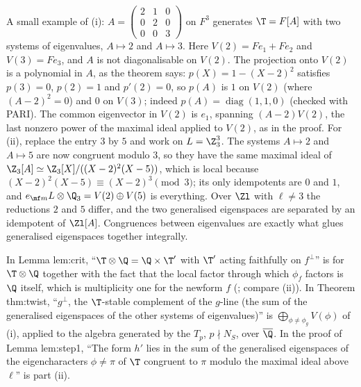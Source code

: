 A small example of (i): $A=\begin{pmatrix}2&1&0\\0&2&0\\0&0&3\end{pmatrix}$ on $F^3$ generates $\T=F[A]$ with two systems of eigenvalues, $A\mapsto2$ and $A\mapsto3$.
Here $V(2)=Fe_1+Fe_2$ and $V(3)=Fe_3$, and $A$ is not diagonalisable on $V(2)$. The projection onto $V(2)$ is a polynomial in $A$, as the theorem
says: $p(X)=1-(X-2)^2$ satisfies $p(3)=0$, $p(2)=1$ and $p'(2)=0$, so $p(A)$ is $1$ on $V(2)$ (where $(A-2)^2=0$) and $0$ on $V(3)$; indeed
$p(A)=\operatorname{diag}(1,1,0)$ (checked with PARI). The common eigenvector in $V(2)$ is $e_1$, spanning $(A-2)V(2)$, the last nonzero power
of the maximal ideal applied to $V(2)$, as in the proof. For (ii), replace the entry $3$ by $5$ and work on $L=\Z_3^3$. The systems
$A\mapsto2$ and $A\mapsto5$ are now congruent modulo $3$, so they have the same maximal ideal of $\Z_3[A]\simeq\Z_3[X]/((X-2)^2(X-5))$, which is
local because $(X-2)^2(X-5)\equiv(X-2)^3\pmod3$; its only idempotents are $0$ and $1$, and $e_{\mf m}L\otimes\Q_3=V(2)\oplus V(5)$ is everything. Over $\Zl$
with $\ell\ne3$ the reductions $2$ and $5$ differ, and the two generalised eigenspaces are separated by an idempotent of $\Zl[A]$. Congruences
between eigenvalues are exactly what glues generalised eigenspaces together integrally.

\begin{paperlink}\label{pl:modules:eigenspaces}
In Lemma lem:crit, ``$\T\otimes\Q=\Q\times\T'$ with $\T'$ acting faithfully on $f^\perp$'' is  for $\T\otimes\Q$ together with the fact
that the local factor through which $\phi_f$ factors is $\Q$ itself, which is multiplicity one for the newform $f$ (; compare
(ii)). In Theorem thm:twist, ``$g^\perp$, the $\T$-stable complement of the $g$-line (the sum of the generalised eigenspaces
of the other systems of eigenvalues)'' is $\bigoplus_{\phi\ne\phi_g}V(\phi)$ of (i), applied to the algebra generated by the $T_p$,
$p\nmid N_S$, over $\overline\Q$. In the proof of Lemma lem:step1, ``The form $h'$ lies in the sum of the generalised eigenspaces of the eigencharacters $\phi\ne\pi$ of $\T$
congruent to $\pi$ modulo the maximal ideal above $\ell$'' is part (ii).
\end{paperlink}

